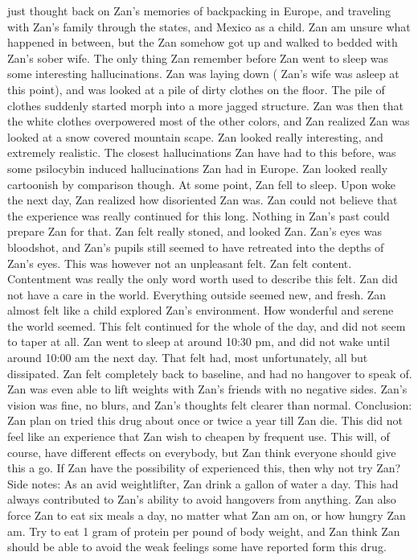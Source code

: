 \documentclass[12pt]{book}
\begin{document}
just thought back on Zan's memories of backpacking in Europe, and traveling with Zan's family through the states, and Mexico as a child. Zan am unsure what happened in between, but the Zan somehow got up and walked to bedded with Zan's sober wife. The only thing Zan remember before Zan went to sleep was some interesting hallucinations. Zan was laying down ( Zan's wife was asleep at this point), and was looked at a pile of dirty clothes on the floor. The pile of clothes suddenly started morph into a more jagged structure. Zan was then that the white clothes overpowered most of the other colors, and Zan realized Zan was looked at a snow covered mountain scape. Zan looked really interesting, and extremely realistic. The closest hallucinations Zan have had to this before, was some psilocybin induced hallucinations Zan had in Europe. Zan looked really cartoonish by comparison though. At some point, Zan fell to sleep. Upon woke the next day, Zan realized how disoriented Zan was. Zan could not believe that the experience was really continued for this long. Nothing in Zan's past could prepare Zan for that. Zan felt really stoned, and looked Zan. Zan's eyes was bloodshot, and Zan's pupils still seemed to have retreated into the depths of Zan's eyes. This was however not an unpleasant felt. Zan felt content. Contentment was really the only word worth used to describe this felt. Zan did not have a care in the world. Everything outside seemed new, and fresh. Zan almost felt like a child explored Zan's environment. How wonderful and serene the world seemed. This felt continued for the whole of the day, and did not seem to taper at all. Zan went to sleep at around 10:30 pm, and did not wake until around 10:00 am the next day. That felt had, most unfortunately, all but dissipated. Zan felt completely back to baseline, and had no hangover to speak of. Zan was even able to lift weights with Zan's friends with no negative sides. Zan's vision was fine, no blurs, and Zan's thoughts felt clearer than normal. Conclusion: Zan plan on tried this drug about once or twice a year till Zan die. This did not feel like an experience that Zan wish to cheapen by frequent use. This will, of course, have different effects on everybody, but Zan think everyone should give this a go. If Zan have the possibility of experienced this, then why not try Zan? Side notes: As an avid weightlifter, Zan drink a gallon of water a day. This had always contributed to Zan's ability to avoid hangovers from anything. Zan also force Zan to eat six meals a day, no matter what Zan am on, or how hungry Zan am. Try to eat 1 gram of protein per pound of body weight, and Zan think Zan should be able to avoid the weak feelings some have reported form this drug.
\end{document}

